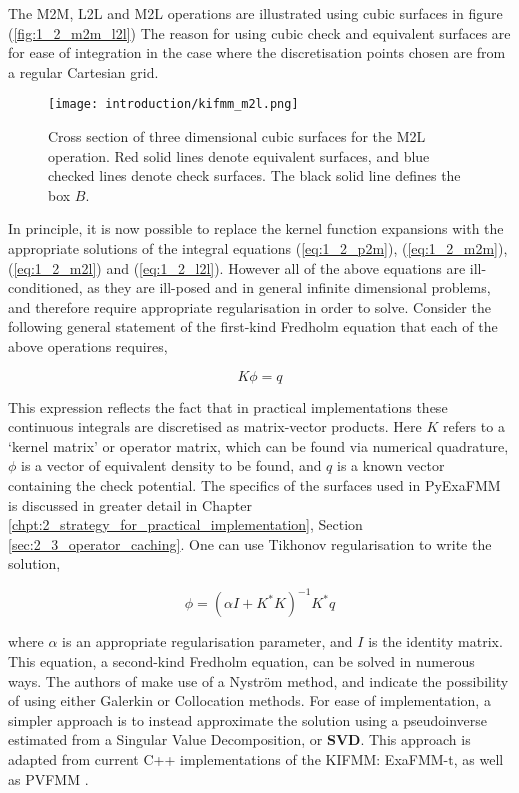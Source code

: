 The \gls{M2M}, \gls{L2L} and \gls{M2L} operations are illustrated using cubic surfaces in figure (\ref{fig:1_2_m2m_l2l})
The reason for using cubic check and equivalent surfaces are for ease of integration
in the case where the discretisation points chosen are from a regular Cartesian
grid.

\begin{figure}[!h]
    \centering
    {\texttt{[image: introduction/kifmm\_m2l.png]}}
    \caption{Cross section of three dimensional cubic surfaces for the \gls{M2L} operation.
    Red solid lines denote equivalent surfaces, and blue checked lines denote check surfaces.
    The black solid line defines the box $B$.}
  \label{fig:1_2_m2l}
\end{figure}

In principle, it is now possible to replace the kernel function expansions with
the appropriate solutions of the integral equations (\ref{eq:1_2_p2m}),
(\ref{eq:1_2_m2m}), (\ref{eq:1_2_m2l}) and (\ref{eq:1_2_l2l}). However all of
the above equations are ill-conditioned, as they are ill-posed and in general infinite
dimensional problems, and therefore require appropriate regularisation in order to solve.
Consider the following general statement of the first-kind Fredholm equation
that each of the above operations requires,

\begin{equation}
K \phi = q
\label{eq:1_2_first_kind_fredholm}
\end{equation}

This expression reflects the fact that in practical implementations these continuous
integrals are discretised as matrix-vector products. Here $K$ refers to a
`kernel matrix' or operator matrix, which can be found via numerical quadrature, $\phi$ is a vector
of equivalent density to be found, and $q$ is a known vector containing the check
potential. The specifics of the surfaces used in PyExaFMM is discussed in
greater detail in Chapter \ref{chpt:2_strategy_for_practical_implementation},
Section \ref{sec:2_3_operator_caching}. One can use Tikhonov regularisation to
write the solution,

\begin{equation}
\phi = (\alpha I + K^*K)^{-1}K^*q
\label{eq:1_2_tikhonov}
\end{equation}

where $\alpha$ is an appropriate regularisation parameter, and $I$ is the identity
matrix. This equation, a second-kind Fredholm equation, can be solved in numerous
ways. The authors of \cite{Ying:2004:JCP} make use of a Nyström method, and indicate
the possibility of using either Galerkin or Collocation methods. For ease of
implementation, a simpler approach is to instead approximate the solution using a pseudoinverse
estimated from a Singular Value Decomposition, or \textbf{\gls{SVD}}. This
approach is adapted from current C++ implementations of the \gls{KIFMM}: ExaFMM-t,
as well as PVFMM \cite{Malhotra:2015:CCP,exafmm}.


